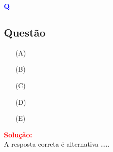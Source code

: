 \begin{flushleft}
\textbf{\textcolor{blue}{\Large Q}}\\
\noindent

\subsection{Quest\~ao }

\begin{itemize}
\item[(A)] 
\item[(B)] 
\item[(C)] 
\item[(D)] 
\item[(E)] 
\end{itemize}

\vspace{0.5cm}

\textcolor{red}{\textbf{Solução:}}\\

A resposta correta é alternativa \colorbox{green!50}{\textbf{...}}.
\end{flushleft}
